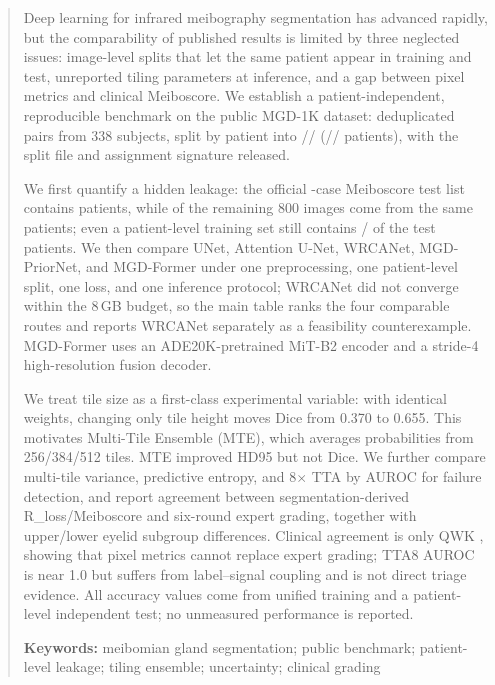 \begin{abstract}
Deep learning for infrared meibography segmentation has advanced rapidly, but the comparability of published results is limited by three neglected issues: image-level splits that let the same patient appear in training and test, unreported tiling parameters at inference, and a gap between pixel metrics and clinical Meiboscore. We establish a patient-independent, reproducible benchmark on the public MGD-1K dataset: \nTotal{} deduplicated pairs from 338 subjects, split by patient into \nTrain/\nVal/\nTest{} (\nTrainPatients/\nValPatients/\nTestPatients{} patients), with the split file and assignment signature released.

We first quantify a hidden leakage: the official \officialTestImages-case Meiboscore test list contains \officialTestPatients{} patients, while \officialLeakImages{} of the remaining 800 images come from the same patients; even a patient-level training set still contains \officialLeakPatients/\officialTestPatients{} of the test patients. We then compare UNet, Attention U-Net, WRCANet, MGD-PriorNet, and MGD-Former under one preprocessing, one patient-level split, one loss, and one inference protocol; WRCANet did not converge within the 8\,GB budget, so the main table ranks the four comparable routes and reports WRCANet separately as a feasibility counterexample. MGD-Former uses an ADE20K-pretrained MiT-B2 encoder and a stride-4 high-resolution fusion decoder.

We treat tile size as a first-class experimental variable: with identical weights, changing only tile height moves Dice from 0.370 to 0.655. This motivates Multi-Tile Ensemble (MTE), which averages probabilities from 256/384/512 tiles. MTE improved HD95 but not Dice. We further compare multi-tile variance, predictive entropy, and 8$\times$ TTA by AUROC for failure detection, and report agreement between segmentation-derived R\_loss/Meiboscore and six-round expert grading, together with upper/lower eyelid subgroup differences. Clinical agreement is only QWK \qwkMF, showing that pixel metrics cannot replace expert grading; TTA8 AUROC is near 1.0 but suffers from label--signal coupling and is not direct triage evidence. All accuracy values come from unified training and a patient-level independent test; no unmeasured performance is reported.

\vspace{0.6em}
\noindent\textbf{Keywords:} meibomian gland segmentation; public benchmark; patient-level leakage; tiling ensemble; uncertainty; clinical grading
\end{abstract}
